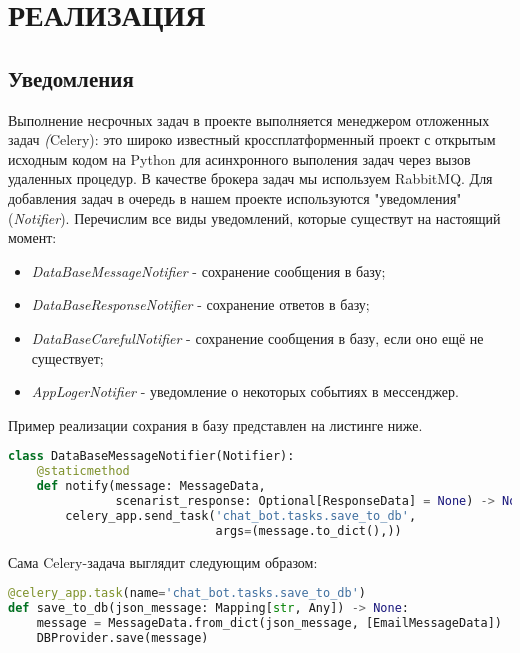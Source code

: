 \section{РЕАЛИЗАЦИЯ}
    \subsection{Уведомления}
    Выполнение несрочных задач в проекте выполняется менеджером отложенных задач \textit(Celery):
    это широко известный кроссплатформенный проект с открытым исходным кодом на Python для
    асинхронного выполения задач через вызов удаленных процедур. В качестве брокера задач мы используем RabbitMQ.
    Для добавления задач в очередь в нашем проекте используются "уведомления" (\textit{Notifier}).
    Перечислим все виды уведомлений, которые существут на настоящий момент:
    \begin{itemize}
        \item \textit{DataBaseMessageNotifier} - сохранение сообщения в базу;
        \item \textit{DataBaseResponseNotifier} - сохранение ответов в базу;
        \item \textit{DataBaseCarefulNotifier} - сохранение сообщения в базу, если оно ещё не существует;
        \item \textit{AppLogerNotifier} - уведомление о некоторых событиях в мессенджер.
    \end{itemize}
    Пример реализации сохрания в базу представлен на листинге ниже.
\begin{lstlisting}[language=Python]
class DataBaseMessageNotifier(Notifier):
    @staticmethod
    def notify(message: MessageData,
               scenarist_response: Optional[ResponseData] = None) -> None:
        celery_app.send_task('chat_bot.tasks.save_to_db',
                             args=(message.to_dict(),))
\end{lstlisting}

    Сама Celery-задача выглядит следующим образом:
\begin{lstlisting}[language=Python]
@celery_app.task(name='chat_bot.tasks.save_to_db')
def save_to_db(json_message: Mapping[str, Any]) -> None:
    message = MessageData.from_dict(json_message, [EmailMessageData])
    DBProvider.save(message)
\end{lstlisting}

